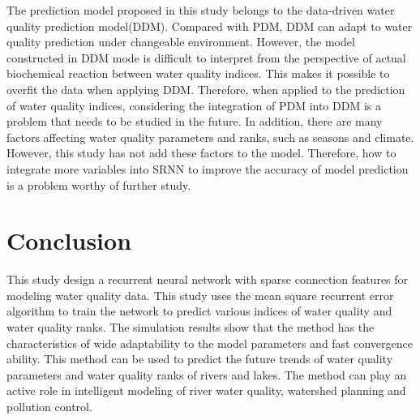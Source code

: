 \documentclass[runningheads]{llncs}
\begin{document}
The prediction model proposed in this study belongs to the 
data-driven water quality prediction model(DDM). Compared with
PDM, DDM can adapt to water quality prediction under changeable 
environment. However, the model constructed in DDM mode is 
difficult to interpret from the perspective of actual biochemical 
reaction between water quality indices. This makes it possible
to overfit the data when applying DDM. Therefore, when applied to 
the prediction of water quality indices, considering the integration 
of PDM into DDM is a problem that needs to be studied in the future.
In addition, there are many factors affecting water quality parameters 
and ranks, such as seasons and climate. However, this study has not add 
these factors to the model. Therefore, how to integrate more variables 
into SRNN to improve the accuracy of model prediction is a problem 
worthy of further study.  

\section{Conclusion}
This study design a recurrent neural network with sparse
connection features for modeling water quality data. 
This study uses the mean square recurrent error algorithm 
to train the network to predict various indices of water 
quality and water quality ranks. The simulation results 
show that the method has the characteristics of wide 
adaptability to the model parameters and fast convergence ability.
This method can be used to predict the future trends of
water quality parameters and water quality ranks of 
rivers and lakes. The method can play an active role 
in intelligent modeling of river water quality, 
watershed planning and pollution control.
%
%
%
 
 
\end{document}
